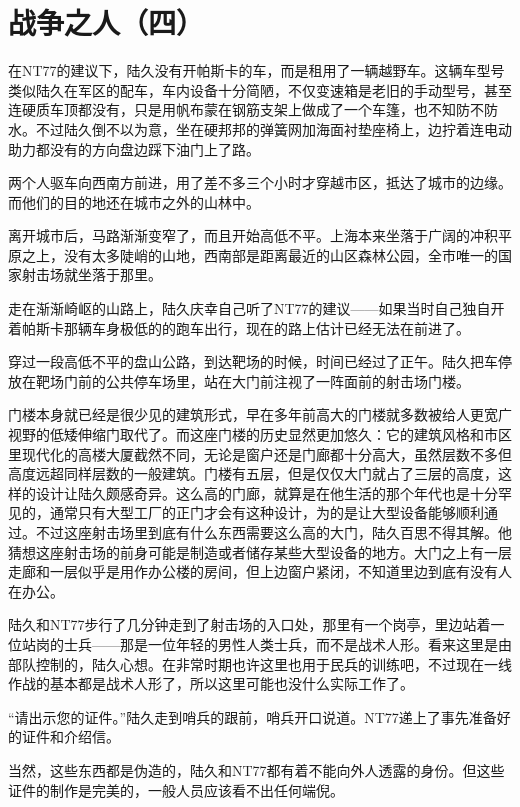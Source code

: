 \chapter{战争之人（四）}

在NT77的建议下，陆久没有开帕斯卡的车，而是租用了一辆越野车。这辆车型号类似陆久在军区的配车，车内设备十分简陋，不仅变速箱是老旧的手动型号，甚至连硬质车顶都没有，只是用帆布蒙在钢筋支架上做成了一个车篷，也不知防不防水。不过陆久倒不以为意，坐在硬邦邦的弹簧网加海面衬垫座椅上，边拧着连电动助力都没有的方向盘边踩下油门上了路。

两个人驱车向西南方前进，用了差不多三个小时才穿越市区，抵达了城市的边缘。而他们的目的地还在城市之外的山林中。

离开城市后，马路渐渐变窄了，而且开始高低不平。上海本来坐落于广阔的冲积平原之上，没有太多陡峭的山地，西南部是距离最近的山区森林公园，全市唯一的国家射击场就坐落于那里。

走在渐渐崎岖的山路上，陆久庆幸自己听了NT77的建议——如果当时自己独自开着帕斯卡那辆车身极低的的跑车出行，现在的路上估计已经无法在前进了。

穿过一段高低不平的盘山公路，到达靶场的时候，时间已经过了正午。陆久把车停放在靶场门前的公共停车场里，站在大门前注视了一阵面前的射击场门楼。

门楼本身就已经是很少见的建筑形式，早在多年前高大的门楼就多数被给人更宽广视野的低矮伸缩门取代了。而这座门楼的历史显然更加悠久：它的建筑风格和市区里现代化的高楼大厦截然不同，无论是窗户还是门廊都十分高大，虽然层数不多但高度远超同样层数的一般建筑。门楼有五层，但是仅仅大门就占了三层的高度，这样的设计让陆久颇感奇异。这么高的门廊，就算是在他生活的那个年代也是十分罕见的，通常只有大型工厂的正门才会有这种设计，为的是让大型设备能够顺利通过。不过这座射击场里到底有什么东西需要这么高的大门，陆久百思不得其解。他猜想这座射击场的前身可能是制造或者储存某些大型设备的地方。大门之上有一层走廊和一层似乎是用作办公楼的房间，但上边窗户紧闭，不知道里边到底有没有人在办公。

陆久和NT77步行了几分钟走到了射击场的入口处，那里有一个岗亭，里边站着一位站岗的士兵——那是一位年轻的男性人类士兵，而不是战术人形。看来这里是由部队控制的，陆久心想。在非常时期也许这里也用于民兵的训练吧，不过现在一线作战的基本都是战术人形了，所以这里可能也没什么实际工作了。

“请出示您的证件。”陆久走到哨兵的跟前，哨兵开口说道。NT77递上了事先准备好的证件和介绍信。

当然，这些东西都是伪造的，陆久和NT77都有着不能向外人透露的身份。但这些证件的制作是完美的，一般人员应该看不出任何端倪。

